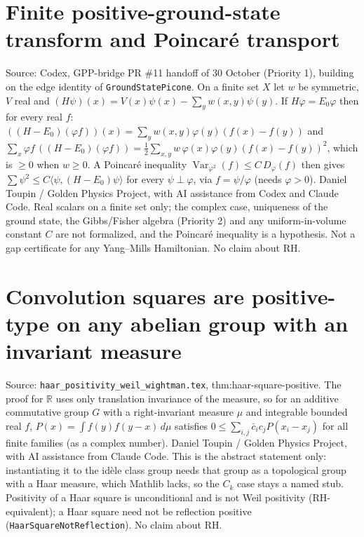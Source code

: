 \documentclass{report}
\theoremstyle{definition}
\begin{document}
\begin{itemize}
\begin{itemize}
\section{Finite positive-ground-state transform and Poincar\'e transport}
Source: Codex, GPP-bridge PR \#11 handoff of 30 October (Priority 1), building on the edge identity of \texttt{GroundStatePicone}. On a finite set $X$ let $w$ be symmetric, $V$ real and
$(H\psi)(x)=V(x)\psi(x)-\sum_yw(x,y)\psi(y)$. If $H\varphi=E_0\varphi$ then for every real $f$: $((H-E_0)(\varphi f))(x)=\sum_yw(x,y)\varphi(y)(f(x)-f(y))$ and
$\sum_x\varphi f\,((H-E_0)(\varphi f))=\tfrac12\sum_{x,y}w\,\varphi(x)\varphi(y)(f(x)-f(y))^2$, which is $\ge0$ when $w\ge0$. A Poincar\'e inequality $\operatorname{Var}_{\varphi^2}(f)\le C\,D_\varphi(f)$ then gives
$\sum\psi^2\le C\langle\psi,(H-E_0)\psi\rangle$ for every $\psi\perp\varphi$, via $f=\psi/\varphi$ (needs $\varphi>0$).
Daniel Toupin / Golden Physics Project, with AI assistance from Codex and Claude Code. Real scalars on a finite set only; the complex case, uniqueness of the ground state, the Gibbs/Fisher algebra (Priority 2) and any uniform-in-volume constant $C$
are not formalized, and the Poincar\'e inequality is a hypothesis. Not a gap certificate for any Yang--Mills Hamiltonian. No claim about RH.
\section{Convolution squares are positive-type on any abelian group with an invariant measure}
Source: \texttt{haar\_positivity\_weil\_wightman.tex}, thm:haar-square-positive. The proof for $\mathbb R$ uses only translation invariance of the measure, so for an additive commutative group $G$
with a right-invariant measure $\mu$ and integrable bounded real $f$, $P(x)=\int f(y)f(y-x)\,d\mu$ satisfies $0\le\sum_{i,j}\bar c_ic_jP(x_i-x_j)$ for all finite families (as a complex number).
Daniel Toupin / Golden Physics Project, with AI assistance from Claude Code. This is the abstract statement only: instantiating it to the id\`ele class group needs that group as a topological
group with a Haar measure, which Mathlib lacks, so the $C_k$ case stays a named stub. Positivity of a Haar square is unconditional and is not Weil positivity (RH-equivalent); a Haar square
need not be reflection positive (\texttt{HaarSquareNotReflection}). No claim about RH.

\end{itemize}
\end{itemize}
\end{document}

